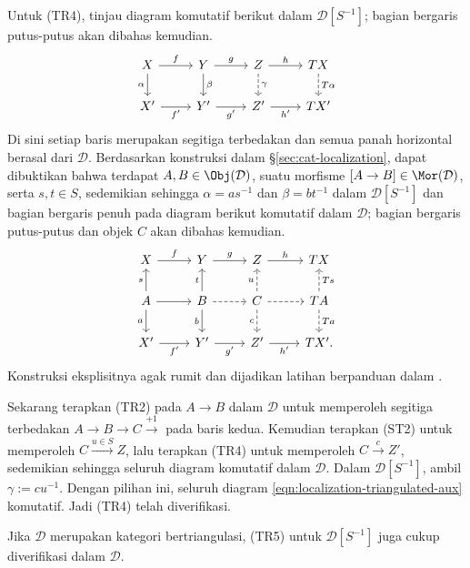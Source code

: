 \begin{bukti}
	Untuk (TR4), tinjau diagram komutatif berikut dalam
	$\mathcal{D}[S^{-1}]$; bagian bergaris putus-putus akan dibahas kemudian.
	\begin{equation}\label{eqn:localization-triangulated-aux}\begin{tikzcd}
		X \arrow[r, "f"] \arrow[d, "\alpha"'] & Y \arrow[r, "g"] \arrow[d, "\beta"] & Z \arrow[r, "h"] \arrow[dashed, d, "\gamma"] & TX \arrow[dashed, d, "T\alpha"] \\
		X' \arrow[r, "{f'}"'] & Y' \arrow[r, "{g'}"'] & Z' \arrow[r, "{h'}"'] & T X'
	\end{tikzcd}\end{equation}
	Di sini setiap baris merupakan segitiga terbedakan dan semua panah horizontal
	berasal dari $\mathcal{D}$. Berdasarkan konstruksi dalam
	\S\ref{sec:cat-localization}, dapat dibuktikan bahwa terdapat
	$A, B \in \Obj(\mathcal{D})$, suatu morfisme
	$[A \to B] \in \Mor(\mathcal{D})$, serta $s, t \in S$, sedemikian sehingga
	$\alpha = as^{-1}$ dan $\beta = bt^{-1}$ dalam $\mathcal{D}[S^{-1}]$ dan
	bagian bergaris penuh pada diagram berikut komutatif dalam $\mathcal{D}$;
	bagian bergaris putus-putus dan objek $C$ akan dibahas kemudian.
	\[\begin{tikzcd}
		X \arrow[r, "f"] & Y \arrow[r, "g"] & Z \arrow[r, "h"] & TX \\
		A \arrow[u, "s"] \arrow[d, "a"'] \arrow[r] & B \arrow[u, "t"] \arrow[d, "b"'] \arrow[dashed, r] & C \arrow[dashed, u, "u"] \arrow[dashed, r] \arrow[dashed, d, "c"'] & TA \arrow[dashed, u, "Ts"'] \arrow[dashed, d, "Ta"] \\
		X' \arrow[r, "{f'}"'] & Y' \arrow[r, "{g'}"'] & Z' \arrow[r, "{h'}"'] & T X' .
	\end{tikzcd}\]
	Konstruksi eksplisitnya agak rumit dan dijadikan latihan berpanduan dalam
	.

	Sekarang terapkan (TR2) pada $A \to B$ dalam $\mathcal{D}$ untuk memperoleh
	segitiga terbedakan $A \to B \to C \xrightarrow{+1}$ pada baris kedua.
	Kemudian terapkan (ST2) untuk memperoleh $C \xrightarrow{u \in S} Z$, lalu
	terapkan (TR4) untuk memperoleh $C \xrightarrow{c} Z'$, sedemikian sehingga
	seluruh diagram komutatif dalam $\mathcal{D}$. Dalam
	$\mathcal{D}[S^{-1}]$, ambil $\gamma := c u^{-1}$. Dengan pilihan ini,
	seluruh diagram \eqref{eqn:localization-triangulated-aux} komutatif. Jadi (TR4)
	telah diverifikasi.
	
	Jika $\mathcal{D}$ merupakan kategori bertriangulasi, (TR5) untuk
	$\mathcal{D}[S^{-1}]$ juga cukup diverifikasi dalam $\mathcal{D}$.
\end{bukti}
